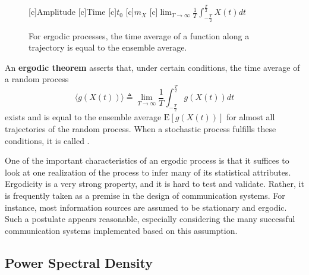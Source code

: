 \begin{figure}[htbp]
\begin{center}
\begin{psfrags}
[c]{Amplitude}
[c]{Time}
[c]{$t_0$}
[c]{$m_X$}
[c]{$\lim_{T \rightarrow \infty} \frac{1}{T} \int_{- \frac{T}{2}}^{\frac{T}{2}} X(t) dt$}
\end{psfrags}
\caption{For ergodic processes, the time average of a function along a trajectory is equal to the ensemble average.}
\label{figure:ErgodicProcess}
\end{center}
\end{figure}

\begin{definition}[Ergodic]
An \textbf{ergodic theorem} asserts that, under certain conditions, the time average of a random process
\begin{equation*}
\langle g(X(t)) \rangle \triangleq \lim_{T \rightarrow \infty} \frac{1}{T} \int_{- \frac{T}{2}}^{\frac{T}{2}} g(X(t)) dt
\end{equation*}
exists and is equal to the ensemble average $\mathrm{E}[g(X(t))]$ for almost all trajectories of the random process.
When a stochastic process fulfills these conditions, it is called .
\end{definition}

One of the important characteristics of an ergodic process is that it suffices to look at one realization of the process to infer many of its statistical attributes.
Ergodicity is a very strong property, and it is hard to test and validate.
Rather, it is frequently taken as a premise in the design of communication systems.
For instance, most information sources are assumed to be stationary and ergodic.
Such a postulate appears reasonable, especially considering the many successful communication systems implemented based on this assumption.


\subsection{Power Spectral Density}

